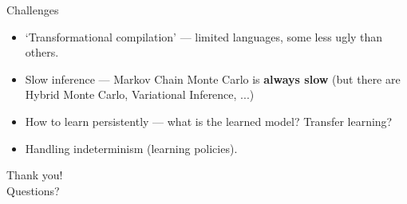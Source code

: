 \documentclass{beamer}
\begin{document}
\begin{frame}{Challenges}
    \begin{itemize}
        \item `Transformational compilation' --- limited languages, some less ugly than others.
        \item Slow inference --- Markov Chain Monte Carlo is \textbf{always slow} (but there are Hybrid Monte Carlo, Variational Inference, ...)
        \item How to learn persistently --- what is the learned model? Transfer learning?
        \item Handling indeterminism (learning policies).
    \end{itemize}
\end{frame}

\begin{frame}
    \LARGE
    \center
    Thank you!\\Questions?
\end{frame}
\end{document}
